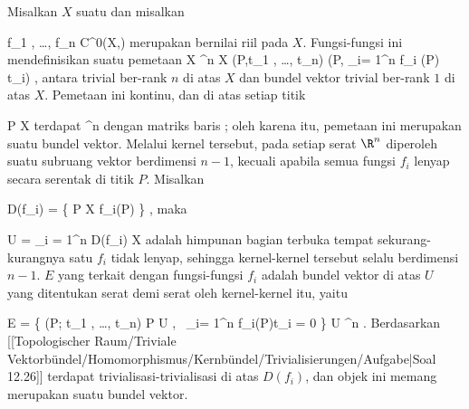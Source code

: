 {}
{

Misalkan $X$ suatu
dan misalkan

\mavergleichskette
{\vergleichskette
{ f_1 , \ldots , f_n
}
{ \in }{ C^0(X,\R)
}
{  }{
}
{    }{
}
{   }{
}
}
{}{}{}
merupakan
bernilai riil pada $X$. Fungsi-fungsi ini mendefinisikan suatu pemetaan
\maabbeledisp {} {X \times \R^n } { X \times \R
} {(P,t_1 , \ldots , t_n) } { (P, \sum_{i= 1}^n f_i (P) t_i)
} {,}
antara
trivial ber-rank $n$ di atas $X$ dan bundel vektor trivial ber-rank $1$ di atas $X$. Pemetaan ini kontinu, dan di atas setiap titik

\mavergleichskette
{\vergleichskette
{ P
}
{ \in }{ X
}
{  }{
}
{    }{
}
{   }{
}
}
{}{}{}
terdapat
\maabb {} {\R^n } { \R
} {}
dengan matriks baris
; oleh karena itu, pemetaan ini merupakan suatu
bundel vektor. Melalui kernel tersebut, pada setiap serat $\R^n$ diperoleh suatu subruang vektor berdimensi $n-1$, kecuali apabila semua fungsi $f_i$ lenyap secara serentak di titik $P$. Misalkan

\mavergleichskette
{\vergleichskette
{ D(f_i)
}
{ = }{ \left\{ P \in X  \mid  f_i(P)         \right\}
}
{  }{
}
{    }{
}
{   }{
}
}
{}{}{,}
maka

\mavergleichskette
{\vergleichskette
{ U
}
{ = }{ \bigcup_{i = 1}^n D(f_i)
}
{ \subseteq }{ X
}
{    }{
}
{   }{
}
}
{}{}{}
adalah himpunan bagian terbuka tempat sekurang-kurangnya satu $f_i$ tidak lenyap, sehingga kernel-kernel tersebut selalu berdimensi $n-1$.  {} $E$ yang terkait dengan fungsi-fungsi $f_i$ adalah bundel vektor di atas $U$ yang ditentukan serat demi serat oleh kernel-kernel itu, yaitu

\mavergleichskettedisp
{\vergleichskette
{ E
}
{ =} { \left\{  (P; t_1 , \ldots , t_n)  \mid   P \in U , \,  \sum_{i= 1}^n f_i(P)t_i = 0       \right\}
}
{ \subseteq} { U \times \R^n
}
{ } {
}
{ } {
}
}
{}{}{.}
Berdasarkan
[[Topologischer Raum/Triviale Vektorbündel/Homomorphismus/Kernbündel/Trivialisierungen/Aufgabe|Soal 12.26]]
terdapat trivialisasi-trivialisasi di atas $D(f_i)$, dan objek ini memang merupakan suatu bundel vektor.

}

